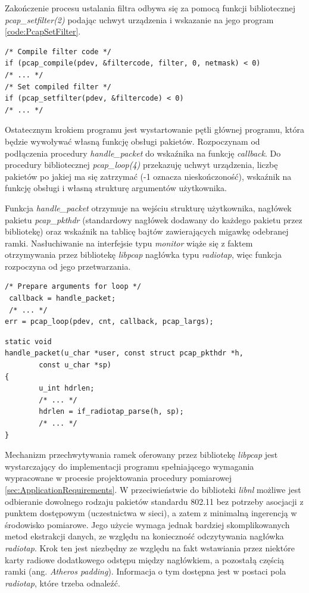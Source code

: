 Zakończenie procesu ustalania filtra odbywa się za pomocą funkcji bibliotecznej \emph{pcap\_setfilter(2)} podając uchwyt urządzenia i wskazanie na jego program \ref{code:PcapSetFilter}.

\begin{lstlisting}[frame=tb]
/* Compile filter code */
if (pcap_compile(pdev, &filtercode, filter, 0, netmask) < 0)
/* ... */
/* Set compiled filter */ 
if (pcap_setfilter(pdev, &filtercode) < 0)
/* ... */
\end{lstlisting}

Ostatecznym krokiem programu jest wystartowanie pętli głównej programu, która będzie wywoływać własną funkcję obsługi pakietów. Rozpoczynam od podłączenia procedury \emph{handle\_packet} do wskaźnika na funkcję \emph{callback}. Do procedury bibliotecznej \emph{pcap\_loop(4)} przekazuję uchwyt urządzenia, liczbę pakietów po jakiej ma się zatrzymać (-1 oznacza nieskończoność), wskaźnik na funkcję obsługi i własną strukturę argumentów użytkownika. 

Funkcja \emph{handle\_packet} otrzymuje na wejściu strukturę użytkownika, nagłówek pakietu \emph{pcap\_pkthdr} (standardowy nagłówek dodawany do każdego pakietu przez bibliotekę) oraz wskaźnik na tablicę bajtów zawierających migawkę odebranej ramki. Nasłuchiwanie na interfejsie typu \emph{monitor} wiąże się z faktem otrzymywania przez bibliotekę \emph{libpcap} nagłówka typu \emph{radiotap}, więc funkcja rozpoczyna od jego przetwarzania. 


\begin{lstlisting}[frame=tb]
 /* Prepare arguments for loop */
 callback = handle_packet;
 /* ... */
err = pcap_loop(pdev, cnt, callback, pcap_largs);
\end{lstlisting}

\begin{lstlisting}[frame=tb]
static void
handle_packet(u_char *user, const struct pcap_pkthdr *h, 
        const u_char *sp)
{
        u_int hdrlen;
        /* ... */
        hdrlen = if_radiotap_parse(h, sp);
        /* ... */
}
\end{lstlisting}

Mechanizm przechwytywania ramek oferowany przez bibliotekę \emph{libpcap} jest wystarczający do implementacji programu spełniającego wymagania wypracowane w procesie projektowania procedury pomiarowej \ref{sec:ApplicationRequirements}. W przeciwieństwie do biblioteki \emph{libnl} możliwe jest odbieranie dowolnego rodzaju pakietów standardu 802.11 bez potrzeby asocjacji z punktem dostępowym (uczestnictwa w sieci), a zatem z minimalną ingerencją w środowisko pomiarowe. Jego użycie wymaga jednak bardziej skomplikowanych metod ekstrakcji danych, ze względu na konieczność odczytywania nagłówka \emph{radiotap}. Krok ten jest niezbędny ze względu na fakt wstawiania przez niektóre karty radiowe dodatkowego odstępu między nagłówkiem, a pozostałą częścią ramki (ang. \emph{Atheros padding}). Informacja o tym dostępna jest w postaci pola \emph{radiotap}, które trzeba odnaleźć.

